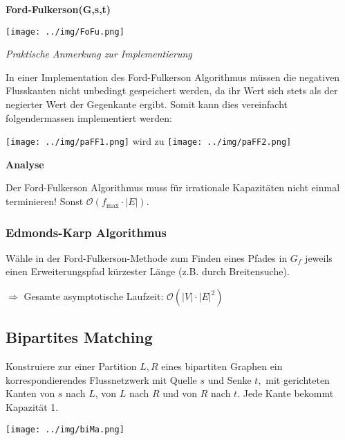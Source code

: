 \documentclass[german]{latex4ei/latex4ei_sheet}
\begin{document}
\begin{sectionbox}
\textbf{Ford-Fulkerson(G,s,t)}\par
\texttt{[image: ../img/FoFu.png]}\par\smallskip

\textit{Praktische Anmerkung zur Implementierung}\par
In einer Implementation des Ford-Fulkerson Algorithmus müssen die negativen Flusskanten nicht unbedingt gespeichert werden, da ihr Wert sich stets als der negierter Wert der Gegenkante ergibt. Somit kann dies vereinfacht folgendermassen implementiert werden:\par\smallskip
\texttt{[image: ../img/paFF1.png]} wird zu
\texttt{[image: ../img/paFF2.png]}\par\smallskip

\textbf{Analyse}\par
Der Ford-Fulkerson Algorithmus muss für irrationale Kapazitäten nicht einmal terminieren! Sonst $\mathcal{O}\left(f_{\max }\cdot |E|\right)$.\vspace{10px}

\subsubsection{Edmonds-Karp Algorithmus}\smallskip
Wähle in der Ford-Fulkerson-Methode zum Finden eines Pfades in $G_{f}$ jeweils einen Erweiterungspfad kürzester Länge (z.B. durch Breitensuche).\par $\Rightarrow$ Gesamte asymptotische Laufzeit: $\mathcal{O}\left(|V| \cdot|E|^{2}\right)$

\end{sectionbox}

\begin{sectionbox}
\subsection{Bipartites Matching}\smallskip
Konstruiere zur einer Partition $L, R$ eines bipartiten Graphen ein korrespondierendes Flussnetzwerk mit Quelle $s$ und Senke $t,$ mit gerichteten Kanten von $s$ nach $L$, von $L$ nach $R$ und von $R$ nach $t$. Jede Kante bekommt Kapazität 1.\par
\texttt{[image: ../img/biMa.png]}\par\smallskip
\end{sectionbox}

\vspace{500px}
\end{document}
